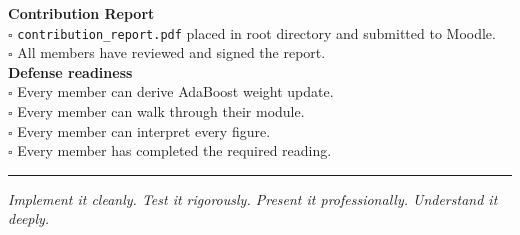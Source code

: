 \documentclass[11pt,a4paper]{article}
\begin{document}
\begin{rubricbox}
\smallskip\textbf{Contribution Report}\\
$\square$ \texttt{contribution\_report.pdf} placed in root directory and submitted to Moodle.\\
$\square$ All members have reviewed and signed the report.\\
\smallskip\textbf{Defense readiness}\\
$\square$ Every member can derive AdaBoost weight update.\\
$\square$ Every member can walk through their module.\\
$\square$ Every member can interpret every figure.\\
$\square$ Every member has completed the required reading.
\end{rubricbox}
\vspace{1.4em}
\hrule\vspace{0.6em}
\noindent\small\textit{Implement it cleanly. Test it rigorously. Present it professionally. Understand it deeply.}
\end{document}
